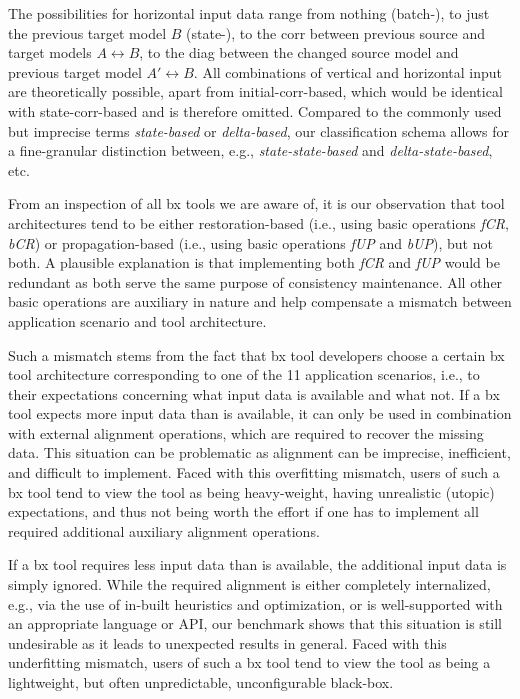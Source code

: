 The possibilities for horizontal input data range from nothing (batch-), to just the previous target model $B$ (state-), to the corr between previous source and target models $A \leftrightarrow B$, to the diag between the changed source model and previous target model $A' \leftrightarrow B$.
All combinations of vertical and horizontal input are theoretically possible, apart from initial-corr-based, which would be identical with state-corr-based and is therefore omitted.
Compared to the commonly used but imprecise terms \emph{state-based} or \emph{delta-based}, our classification schema allows for a fine-granular distinction between, e.g., \emph{state-state-based} and \emph{delta-state-based}, etc.

From an inspection of all bx tools we are aware of, it is our observation that tool architectures tend to be either restoration-based (i.e., using basic operations \emph{fCR}, \emph{bCR}) or propagation-based (i.e., using basic operations \emph{fUP} and \emph{bUP}), but not both.
A plausible explanation is that implementing both \emph{fCR} and \emph{fUP} would be redundant as both serve the same purpose of consistency maintenance.
All other basic operations are auxiliary in nature and help compensate a mismatch between application scenario and tool architecture.

Such a mismatch stems from the fact that bx tool developers choose a certain bx tool architecture corresponding to one of the 11 application scenarios, i.e., to their expectations concerning what input data is available and what not.
If a bx tool expects more input data than is available, it can only be used in combination with external alignment operations, which are required to recover the missing data.
This situation can be problematic as alignment can be imprecise, inefficient, and difficult to implement.
Faced with this overfitting mismatch, users of such a bx tool tend to view the tool as being heavy-weight, having unrealistic (utopic) expectations, and thus not being worth the effort if one has to implement all required additional auxiliary alignment operations.

If a bx tool requires less input data than is available, the additional input data is simply ignored.
While the required alignment is either completely internalized, e.g., via the use of in-built heuristics and optimization, or is well-supported with an appropriate language or API, our benchmark shows that this situation is still undesirable as it leads to unexpected results in general.
Faced with this underfitting mismatch, users of such a bx tool tend to view the tool as being a lightweight, but often unpredictable, unconfigurable black-box.

